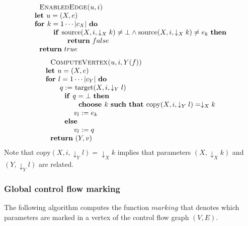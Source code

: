 \begin{equation*}
\begin{tabular}{l}
$\text{\textsc{EnabledEdge}}$\textsc{(}$u,i$\textsc{)} \\ 
\textbf{let }$u=(X,e)$ \\ 
\textbf{for }$k=1\cdots \left\vert c_{X}\right\vert $ \textbf{do} \\ 
$\qquad \text{\textbf{if }}\mathrm{source}(X,i,\downarrow _{X}k)\neq \bot
\wedge \mathrm{source}(X,i,\downarrow _{X}k)\neq e_{k}$ \textbf{then} \\ 
$\qquad \qquad \text{\textbf{return} }false$ \\ 
$\text{\textbf{return} }true$%
\end{tabular}%
\end{equation*}%
\begin{equation*}
\begin{tabular}{l}
$\text{\textsc{ComputeVertex}}$\textsc{(}$u,i,Y(f)$\textsc{)} \\ 
\textbf{let }$u=(X,e)$ \\ 
\textbf{for }$l=1\cdots \left\vert c_{Y}\right\vert $ \textbf{do} \\ 
$\qquad q:=$ $\mathrm{target}(X,i,\downarrow _{Y}l)$ \\ 
$\qquad \text{\textbf{if }}q=\bot $ \textbf{then} \\ 
$\qquad \qquad \text{\textbf{choose }}k$ \textbf{such that }$\mathrm{copy}%
(X,i,\downarrow _{Y}l)=\downarrow _{X}k$ \\ 
$\qquad \qquad v_{l}:=e_{k}$ \\ 
$\qquad \text{\textbf{else}}$ \\ 
$\qquad \qquad v_{l}:=q$ \\ 
$\text{\textbf{return} }(Y,v)$%
\end{tabular}%
\end{equation*}%
Note that $\mathrm{copy}(X,i,\downarrow _{Y}l)=\downarrow _{X}k$ implies
that parameters $(X,\downarrow _{X}k)$ and $(Y,\downarrow _{Y}l)$ are
related.

\newpage

\subsubsection{Global control flow marking}

The following algorithm computes the function $marking$ that denotes which
parameters are marked in a vertex of the control flow graph $(V,E)$.

